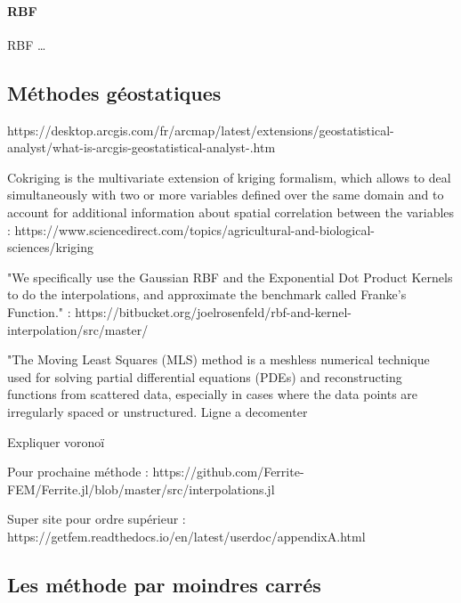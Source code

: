 \paragraph{RBF}
\ac{RBF}
\vspace{0.5cm}
\dots



\subsection{Méthodes géostatiques}
https://desktop.arcgis.com/fr/arcmap/latest/extensions/geostatistical-analyst/what-is-arcgis-geostatistical-analyst-.htm

Cokriging is the multivariate extension of kriging formalism, which allows to deal simultaneously with two or more variables defined over the same domain and to account for additional information about spatial correlation between the variables :
https://www.sciencedirect.com/topics/agricultural-and-biological-sciences/kriging


"We specifically use the Gaussian RBF and the Exponential Dot Product Kernels to do the interpolations, and approximate the benchmark called Franke's Function." : https://bitbucket.org/joelrosenfeld/rbf-and-kernel-interpolation/src/master/

"The Moving Least Squares (MLS) method is a meshless numerical technique used for solving partial differential equations (PDEs) and reconstructing functions from scattered data, especially in cases where the data points are irregularly spaced or unstructured.
Ligne a decomenter%


Expliquer voronoï

Pour prochaine méthode :
https://github.com/Ferrite-FEM/Ferrite.jl/blob/master/src/interpolations.jl


Super site pour ordre supérieur : https://getfem.readthedocs.io/en/latest/userdoc/appendixA.html

\subsection{Les méthode par moindres carrés}

